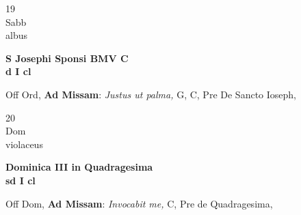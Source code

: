 \documentclass[10pt, openany]{book}
\begin{document}
        \begin{center}
            \begin{minipage}{3.5in}
                \vspace{2em}
                \begin{minipage}{0.5in}
                    {\Huge 19} \\
                    {\normalsize Sabb} \\
                    {\normalsize albus}
                \end{minipage}
                \begin{minipage}{3.0in}
                    \textbf{ \large S Josephi Sponsi BMV C \\
                    \textnormal{\normalsize d I cl}} \\ 
                \end{minipage}
                \begin{justify}Off Ord, \textbf{Ad Missam}: \textit{Justus ut palma,} G, C, Pre De Sancto Ioseph,   
                \end{justify}
            \end{minipage}
        \end{center}
    
        \begin{center}
            \begin{minipage}{3.5in}
                \vspace{2em}
                \begin{minipage}{0.5in}
                    {\Huge 20} \\
                    {\normalsize Dom} \\
                    {\normalsize violaceus}
                \end{minipage}
                \begin{minipage}{3.0in}
                    \textbf{ \large Dominica III in Quadragesima \\
                    \textnormal{\normalsize sd I cl}} \\ 
                \end{minipage}
                \begin{justify}Off Dom, \textbf{Ad Missam}: \textit{Invocabit me,} C, Pre de Quadragesima,   
                \end{justify}
            \end{minipage}
        \end{center}
    
\end{document}
